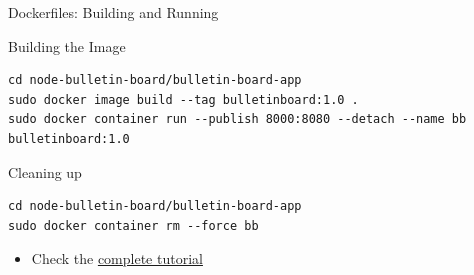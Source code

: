 \documentclass[10pt, compress, aspectratio=169, xcolor={table,usenames,dvipsnames}]{beamer}
\begin{document}
\begin{frame}[label={sec:org11931fa},fragile]{Dockerfiles: Building and Running}
 \begin{block}{Building the Image}
\lstset{language=bash,label= ,caption= ,captionpos=b,numbers=none}
\begin{lstlisting}
cd node-bulletin-board/bulletin-board-app
sudo docker image build --tag bulletinboard:1.0 .
sudo docker container run --publish 8000:8080 --detach --name bb bulletinboard:1.0
\end{lstlisting}
\end{block}

\begin{block}{Cleaning up}
\lstset{language=bash,label= ,caption= ,captionpos=b,numbers=none}
\begin{lstlisting}
cd node-bulletin-board/bulletin-board-app
sudo docker container rm --force bb
\end{lstlisting}

\begin{itemize}
\item Check the \href{https://docs.docker.com/get-started/part2/}{complete tutorial}
\end{itemize}
\end{block}
\end{frame}
\end{document}
